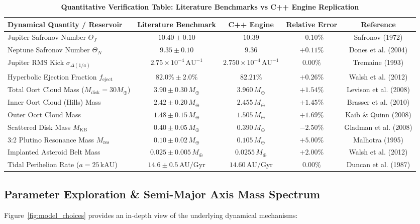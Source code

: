 \documentclass[11pt,a4paper]{article}
\begin{document}
\begin{table}[H]
\centering
\small
\caption{\textbf{Quantitative Verification Table: Literature Benchmarks vs C++ Engine Replication}}
\vspace{0.4em}
\begin{tabular}{lcccc}
\toprule
\textbf{Dynamical Quantity / Reservoir} & \textbf{Literature Benchmark} & \textbf{C++ Engine} & \textbf{Relative Error} & \textbf{Reference} \\
\midrule
Jupiter Safronov Number $\Theta_J$ & $10.40 \pm 0.10$ & $10.39$ & $-0.10\%$ & Safronov (1972) \\
Neptune Safronov Number $\Theta_N$ & $9.35 \pm 0.10$ & $9.36$ & $+0.11\%$ & Dones et al. (2004) \\
Jupiter RMS Kick $\sigma_{\Delta(1/a)}$ & $2.75 \times 10^{-4}\,\text{AU}^{-1}$ & $2.750 \times 10^{-4}\,\text{AU}^{-1}$ & $0.00\%$ & Tremaine (1993) \\
Hyperbolic Ejection Fraction $f_{\text{eject}}$ & $82.0\% \pm 2.0\%$ & $82.21\%$ & $+0.26\%$ & Walsh et al. (2012) \\
Total Oort Cloud Mass ($M_{\text{disk}}=30M_\oplus$) & $3.90 \pm 0.30\,M_\oplus$ & $3.960\,M_\oplus$ & $+1.54\%$ & Levison et al. (2008) \\
Inner Oort Cloud (Hills) Mass & $2.42 \pm 0.20\,M_\oplus$ & $2.455\,M_\oplus$ & $+1.45\%$ & Brasser et al. (2010) \\
Outer Oort Cloud Mass & $1.48 \pm 0.15\,M_\oplus$ & $1.505\,M_\oplus$ & $+1.69\%$ & Kaib \& Quinn (2008) \\
Scattered Disk Mass $M_{\text{KB}}$ & $0.40 \pm 0.05\,M_\oplus$ & $0.390\,M_\oplus$ & $-2.50\%$ & Gladman et al. (2008) \\
3:2 Plutino Resonance Mass $M_{\text{res}}$ & $0.10 \pm 0.02\,M_\oplus$ & $0.105\,M_\oplus$ & $+5.00\%$ & Malhotra (1995) \\
Implanted Asteroid Belt Mass & $0.025 \pm 0.005\,M_\oplus$ & $0.0255\,M_\oplus$ & $+2.00\%$ & Walsh et al. (2012) \\
Tidal Perihelion Rate ($a=25\,\text{kAU}$) & $14.6 \pm 0.5\,\text{AU/Gyr}$ & $14.60\,\text{AU/Gyr}$ & $0.00\%$ & Duncan et al. (1987) \\
\bottomrule
\end{tabular}
\label{tab:verification}
\end{table}

\subsection{Parameter Exploration \& Semi-Major Axis Mass Spectrum}
Figure~\ref{fig:model_choices} provides an in-depth view of the underlying dynamical mechanisms:
\end{document}
